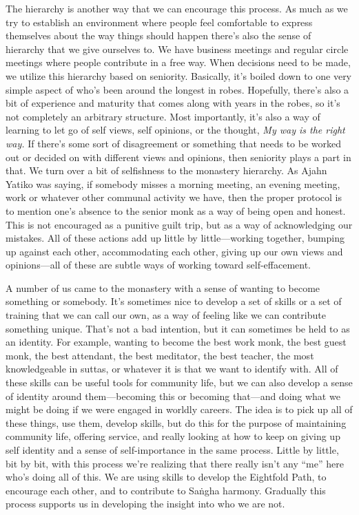 The hierarchy is another way that we can encourage this process. As 
much as we try to establish an environment where people feel 
comfortable to express themselves about the way things should happen 
there's also the sense of hierarchy that we give ourselves to. We have 
business meetings and regular circle meetings where people contribute 
in a free way. When decisions need to be made, we utilize this 
hierarchy based on seniority. Basically, it's boiled down to one very 
simple aspect of who's been around the longest in robes. Hopefully, 
there's also a bit of experience and maturity that comes along with 
years in the robes, so it's not completely an arbitrary structure. Most 
importantly, it's also a way of learning to let go of self views, self 
opinions, or the thought, \emph{My way is the right way.} If there's 
some sort of disagreement or something that needs to be worked out or 
decided on with different views and opinions, then seniority plays a 
part in that. We turn over a bit of selfishness to the monastery 
hierarchy. As Ajahn Yatiko was saying, if somebody misses a morning 
meeting, an evening meeting, work or whatever other communal activity 
we have, then the proper protocol is to mention one's absence to the 
senior monk as a way of being open and honest. This is not encouraged 
as a punitive guilt trip, but as a way of acknowledging our mistakes. 
All of these actions add up little by little---working together, 
bumping up against each other, accommodating each other, giving up our 
own views and opinions---all of these are subtle ways of working toward 
self-effacement.

A number of us came to the monastery with a sense of wanting to become 
something or somebody. It's sometimes nice to develop a set of skills 
or a set of training that we can call our own, as a way of feeling like 
we can contribute something unique. That's not a bad intention, but it 
can sometimes be held to as an identity. For example, wanting to become 
the best work monk, the best guest monk, the best attendant, the best 
meditator, the best teacher, the most knowledgeable in suttas, or 
whatever it is that we want to identify with. All of these skills can 
be useful tools for community life, but we can also develop a sense of 
identity around them---becoming this or becoming that---and doing what 
we might be doing if we were engaged in worldly careers. The idea is to 
pick up all of these things, use them, develop skills, but do this for 
the purpose of maintaining community life, offering service, and really 
looking at how to keep on giving up self identity and a sense of 
self-importance in the same process. Little by little, bit by bit, with 
this process we're realizing that there really isn't any ``me'' here 
who's doing all of this. We are using skills to develop the Eightfold 
Path, to encourage each other, and to contribute to Saṅgha harmony. 
Gradually this process supports us in developing the insight into who 
we are not.

